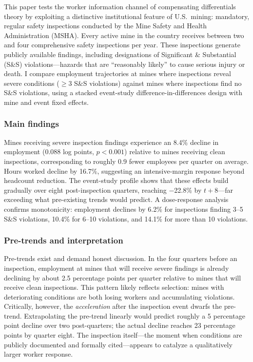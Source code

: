 \documentclass[12pt]{article}
\begin{document}
This paper tests the worker information channel of compensating differentials theory by exploiting a distinctive institutional feature of U.S.\ mining: mandatory, regular safety inspections conducted by the Mine Safety and Health Administration (MSHA). Every active mine in the country receives between two and four comprehensive safety inspections per year. These inspections generate publicly available findings, including designations of Significant \& Substantial (S\&S) violations---hazards that are ``reasonably likely'' to cause serious injury or death. I compare employment trajectories at mines where inspections reveal severe conditions ($\geq$3 S\&S violations) against mines where inspections find no S\&S violations, using a stacked event-study difference-in-differences design with mine and event fixed effects.

\subsubsection*{Main findings} Mines receiving severe inspection findings experience an 8.4\% decline in employment (0.088 log points, $p < 0.001$) relative to mines receiving clean inspections, corresponding to roughly 0.9 fewer employees per quarter on average. Hours worked decline by 16.7\%, suggesting an intensive-margin response beyond headcount reduction. The event-study profile shows that these effects build gradually over eight post-inspection quarters, reaching $-$22.8\% by $t+8$---far exceeding what pre-existing trends would predict. A dose-response analysis confirms monotonicity: employment declines by 6.2\% for inspections finding 3--5 S\&S violations, 10.4\% for 6--10 violations, and 14.1\% for more than 10 violations.

\subsubsection*{Pre-trends and interpretation} Pre-trends exist and demand honest discussion. In the four quarters before an inspection, employment at mines that will receive severe findings is already declining by about 2.5 percentage points per quarter relative to mines that will receive clean inspections. This pattern likely reflects selection: mines with deteriorating conditions are both losing workers and accumulating violations. Critically, however, the \textit{acceleration} after the inspection event dwarfs the pre-trend. Extrapolating the pre-trend linearly would predict roughly a 5 percentage point decline over two post-quarters; the actual decline reaches 23 percentage points by quarter eight. The inspection itself---the moment when conditions are publicly documented and formally cited---appears to catalyze a qualitatively larger worker response.
\end{document}
